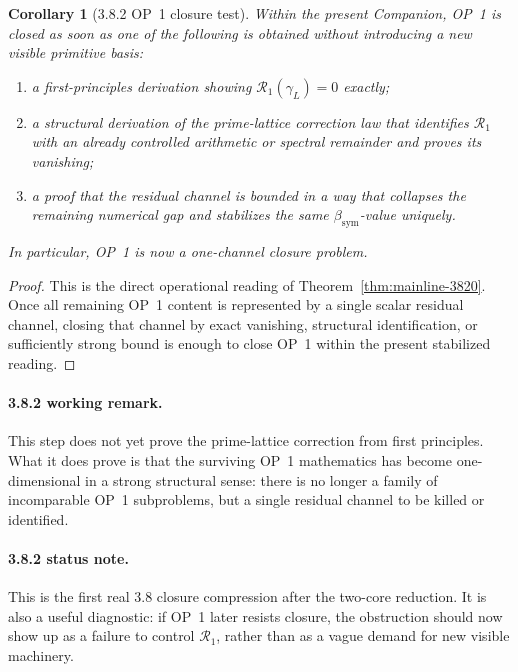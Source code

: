 \documentclass[12pt,a4paper]{article}
\newtheorem{corollary}[theorem]{Corollary}
\begin{document}
\begin{corollary}[3.8.2 OP~1 closure test]
\label{cor:mainline-3820}
Within the present Companion, OP~1 is closed as soon as one of the following is obtained without introducing a new visible primitive basis:
\begin{enumerate}[label=(\alph*), leftmargin=2em]
 \item a first-principles derivation showing \(\mathcal R_{1}(\gamma_L)=0\) exactly;
 \item a structural derivation of the prime-lattice correction law that identifies \(\mathcal R_{1}\) with an already controlled arithmetic or spectral remainder and proves its vanishing;
 \item a proof that the residual channel is bounded in a way that collapses the remaining numerical gap and stabilizes the same \(\beta_{\mathrm{sym}}\)-value uniquely.
\end{enumerate}
In particular, OP~1 is now a one-channel closure problem.
\end{corollary}

\begin{proof}
This is the direct operational reading of Theorem~\ref{thm:mainline-3820}. Once all remaining OP~1 content is represented by a single scalar residual channel, closing that channel by exact vanishing, structural identification, or sufficiently strong bound is enough to close OP~1 within the present stabilized reading.
\end{proof}

\paragraph{3.8.2 working remark.}
This step does not yet prove the prime-lattice correction from first principles. What it does prove is that the surviving OP~1 mathematics has become one-dimensional in a strong structural sense: there is no longer a family of incomparable OP~1 subproblems, but a single residual channel to be killed or identified.

\paragraph{3.8.2 status note.}
This is the first real 3.8 closure compression after the two-core reduction. It is also a useful diagnostic: if OP~1 later resists closure, the obstruction should now show up as a failure to control \(\mathcal R_{1}\), rather than as a vague demand for new visible machinery.
\end{document}
